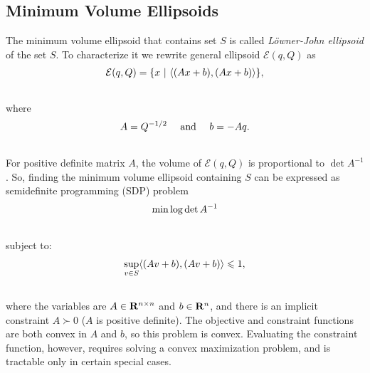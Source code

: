 \documentclass[letterpaper,10pt,english]{sphinxmanual}
\begin{document}
\subsection{Minimum Volume Ellipsoids}
\label{chap_ellcalc:minimum-volume-ellipsoids}
The minimum volume ellipsoid that contains set $S$ is called
\emph{Löwner-John ellipsoid} of the set $S$. To characterize it we
rewrite general ellipsoid ${\mathcal E}(q,Q)$ as
\begin{gather}
\begin{split}{\mathcal E}(q,Q) = \{x ~|~ \langle (Ax + b), (Ax + b)\rangle \},\end{split}\notag\\\begin{split}\end{split}\notag
\end{gather}
where
\begin{gather}
\begin{split}A = Q^{-1/2} ~~~ \mbox{ and } ~~~ b = -Aq .\end{split}\notag\\\begin{split}\end{split}\notag
\end{gather}
For positive definite matrix $A$, the volume of
${\mathcal E}(q,Q)$ is proportional to $\det A^{-1}$. So,
finding the minimum volume ellipsoid containing $S$ can be
expressed as semidefinite programming (SDP) problem
\begin{gather}
\begin{split}\min \log \det A^{-1}\end{split}\notag\\\begin{split}\end{split}\notag
\end{gather}
subject to:
\begin{gather}
\begin{split}\sup_{v\in S} \langle (Av + b), (Av + b)\rangle \leqslant1,\end{split}\notag\\\begin{split}\end{split}\notag
\end{gather}
where the variables are $A\in{\bf R}^{n\times n}$ and
$b\in{\bf R}^n$, and there is an implicit constraint
$A\succ 0$ ($A$ is positive definite). The objective and
constraint functions are both convex in $A$ and $b$, so this
problem is convex. Evaluating the constraint function, however, requires
solving a convex maximization problem, and is tractable only in certain
special cases.
\end{document}
